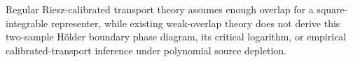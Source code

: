 Regular Riesz-calibrated transport theory assumes enough overlap for a square-integrable representer, while existing weak-overlap theory does not derive this two-sample Hölder boundary phase diagram, its critical logarithm, or empirical calibrated-transport inference under polynomial source depletion.